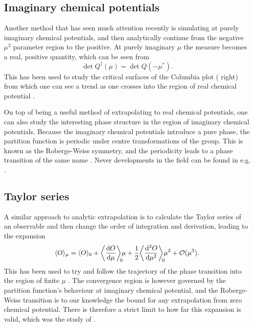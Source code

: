 \subsection{Imaginary chemical potentials}

Another method that has seen much attention recently is simulating at purely
imaginary chemical potentials, and then analytically continue from the negative
$\mu^2$ parameter region to the positive. At purely imaginary $\mu$ the measure
becomes a real, positive quantity, which can be seen from
%
\begin{equation}
  \det Q^{\dagger} (\mu) = \det Q(-\mu^*).
\end{equation}
%
This has been used to study the critical surfaces of the Columbia plot
( right) from which one can see a trend as one crosses
into the region of real chemical potential
\citep{deForcrand:2002hgr,D'Elia:2002gd}.

On top of being a useful method of extrapolating to real chemical potentials,
one can also study the interesting phase structure in the region of imaginary
chemical potentials. Because the imaginary chemical potentials introduce a pure
phase, the partition function is periodic under centre transformations of the
group. This is known as the Roberge-Weiss symmetry, and the periodicity leads to
a phase transition of the same name \citep{Roberge:1986mm}.
Never developments in the field can be found in e.g.
\citep{Wu:2013bfa,Cuteri:2015qkq,Philipsen:2016hkv}.

\subsection{Taylor series}

A similar approach to analytic extrapolation is to calculate the Taylor series
of an observable and then change the order of integration and derivation,
leading to the expansion
%
\begin{equation}
  \langle O \rangle_{\mu} = \langle O \rangle_{0}
   + \bigg\langle \frac{\mathrm{d} O}{\mathrm{d} \mu} \bigg\rangle_{\mathclap{0}} \mu
   + \frac{1}{2} \bigg\langle \frac{\mathrm{d}^2 O}{\mathrm{d} \mu^2} \bigg\rangle_{\mathclap{0}} \mu^2
   + \mathcal{O}(\mu^3).
\end{equation}
%
This has been used to try and follow the trajectory of the phase transition into
the region of finite $\mu$ \citep{Allton:2003vx}. The convergence region is
however governed by the partition function's behaviour at imaginary chemical
potential, and the Roberge-Weiss transition is to our knowledge the bound for
any extrapolation from zero chemical potential. There is therefore a strict
limit to how far this expansion is valid, which was the study of
\citep{Osborn:2008eg}.

